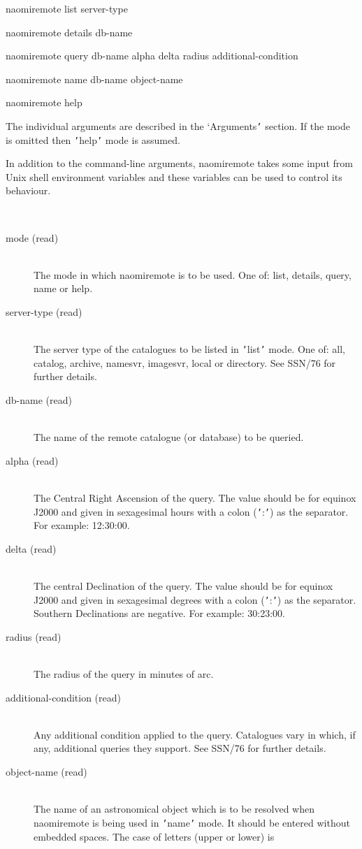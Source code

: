 \documentclass[twoside,11pt]{article}
\renewcommand{\_}{\texttt{\symbol{95}}}
\newcommand{\sstparameters}[1]{
   \item[Parameters:] \mbox{} \\
   \vspace{-3.5ex}
   \begin{description}
      #1
   \end{description}
}
\newcommand{\sstsubsection}[1]{ \item[{#1}] \mbox{} \\}
\newcommand{\sstparameters}[1]{
      \item[Parameters:] \\
      \begin{description}
         #1
      \end{description}
      \\
   }
\newcommand{\sstsubsection}[1]{\item[{#1}]}
\begin{document}
\begin{htmlonly}
{{       naomiremote list    server-type

       naomiremote details db-name

       naomiremote query   db-name alpha delta radius additional-condition

       naomiremote name    db-name object-name

       naomiremote help

      The individual arguments are described in the `Arguments{\tt '} section.
      If the mode is omitted then  {\tt '}help{\tt '} mode is assumed.

      In addition to the command-line arguments, naomiremote takes some
      input from Unix shell environment variables and these variables can
      be used to control its behaviour.
   }
   \sstparameters{
      \sstsubsection{
         mode (read)
      }{
         The mode in which naomiremote is to be used.  One of: list,
         details, query, name or help.
      }
      \sstsubsection{
         server-type (read)
      }{
         The server type of the catalogues to be listed in {\tt '}list{\tt '} mode.
         One of: all, catalog, archive, namesvr, imagesvr, local or
         directory.  See SSN/76 for further details.
      }
      \sstsubsection{
         db-name (read)
      }{
         The name of the remote catalogue (or database) to be queried.
      }
      \sstsubsection{
         alpha (read)
      }{
         The Central Right Ascension of the query.  The value should be
         for equinox J2000 and given in sexagesimal hours with a colon
         ({\tt '}:{\tt '}) as the separator.  For example: 12:30:00.
      }
      \sstsubsection{
         delta (read)
      }{
         The central Declination of the query.  The value should be for
         equinox J2000 and given in sexagesimal degrees with a colon ({\tt '}:{\tt '})
         as the separator.  Southern Declinations are negative.  For
         example: 30:23:00.
      }
      \sstsubsection{
         radius (read)
      }{
         The radius of the query in minutes of arc.
      }
      \sstsubsection{
         additional-condition (read)
      }{
         Any additional condition applied to the query.  Catalogues vary
         in which, if any, additional queries they support.  See SSN/76
         for further details.
      }
      \sstsubsection{
         object-name (read)
      }{
         The name of an astronomical object which is to be resolved when
         naomiremote is being used in {\tt '}name{\tt '} mode.  It should be entered
         without embedded spaces.  The case of letters (upper or lower) is
}}}
\end{htmlonly}
\end{document}
